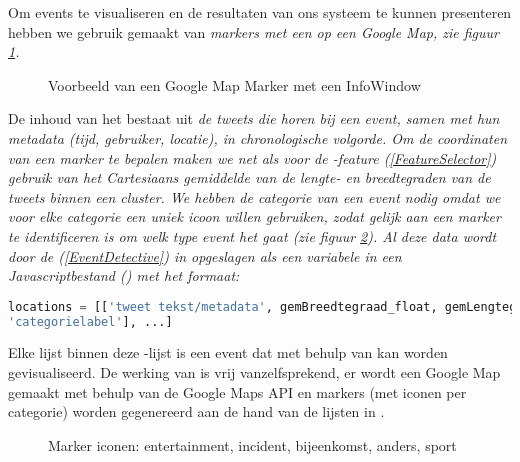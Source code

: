 {{\label{eventvis}

Om events te visualiseren en de resultaten van ons systeem te kunnen presenteren 
hebben we gebruik gemaakt van \it{markers} met een  op een \it{Google Map}, zie 
figuur \ref{mapmarker}.

\begin{figure}[H]
  \centering
    \caption{Voorbeeld van een Google Map Marker met een InfoWindow}
  \label{mapmarker}
\end{figure}

De inhoud van het  bestaat uit \it{de tweets die horen bij een event, 
samen met hun metadata (tijd, gebruiker, locatie)}, in chronologische volgorde. 
Om de coordinaten van een marker te bepalen maken we net als voor de 
-feature (\ref{FeatureSelector}) gebruik van het \it{Cartesiaans gemiddelde van de lengte- 
en breedtegraden} van de tweets binnen een cluster. We hebben de \it{categorie} van 
een event nodig omdat we voor elke categorie een uniek icoon willen gebruiken, 
zodat gelijk aan een marker te identificeren is om welk type event het gaat (zie 
figuur \ref{markers}). Al deze data wordt door de  (\ref{EventDetective}) in  
opgeslagen als een variabele in een Javascriptbestand () 
met het formaat:

\begin{lstlisting}[language=Python]
locations = [['tweet tekst/metadata', gemBreedtegraad_float, gemLengtegraad_float, 
'categorielabel'], ...] 
\end{lstlisting}

Elke lijst binnen deze -lijst is een event dat met behulp van 
 kan worden gevisualiseerd. De werking van  is 
vrij vanzelfsprekend, er wordt een Google Map gemaakt met behulp van de Google 
Maps API en markers (met iconen per categorie) worden gegenereerd aan de hand 
van de lijsten in .

\begin{figure}[H]
  \centering
    \caption{Marker iconen: entertainment, incident, bijeenkomst, anders, sport}
  \label{markers}
\end{figure}

}}
